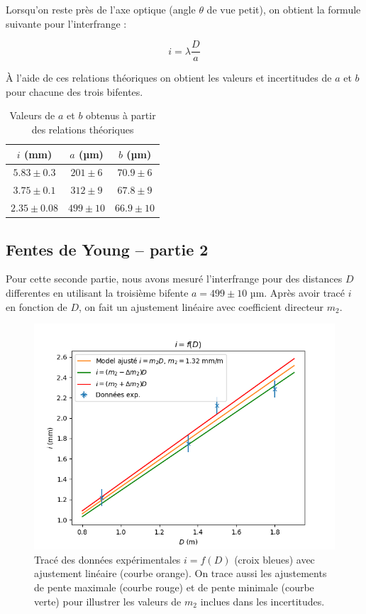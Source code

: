 \documentclass{article}
\begin{document}
Lorsqu'on reste près de l'axe optique (angle $\theta$ de vue petit), on obtient la formule suivante pour l'interfrange :

\begin{equation}
    i = \lambda \frac{D}{a}
    \label{eq:interfrange}
\end{equation}


À l'aide de ces relations théoriques on obtient les valeurs et incertitudes de $a$ et $b$ pour chacune des trois 
bifentes.

\begin{table}[H]
\begin{center}
    \begin{tabular}{|c|c|c|}
    \hline
    $i$ (mm) & $a$ (µm) & $b$ (µm) \\
    \hline
    $5.83 \pm 0.3$ & $201 \pm 6$ & $70.9 \pm 6$ \\
    $3.75 \pm 0.1$ & $312 \pm 9$ & $67.8 \pm 9$ \\
    $2.35 \pm 0.08$ & $499 \pm 10$ & $66.9 \pm 10$ \\
    \hline
\end{tabular}
\end{center}
\caption{Valeurs de $a$ et $b$ obtenus à partir des relations théoriques}
\end{table}

\subsection{Fentes de Young – partie 2}
Pour cette seconde partie, nous avons mesuré l'interfrange pour des distances $D$ differentes en utilisant la troisième bifente $a = 499\pm10 \textrm{ µm}$.
Après avoir tracé $i$ en fonction de $D$, on fait un ajustement linéaire avec coefficient directeur $m_2$.

\begin{figure}[H]
    \centering
    \includegraphics[width=0.6\linewidth]{figs/young_2_i=f(D).png}
    \caption{Tracé des données expérimentales $i=f(D)$ (croix bleues) avec ajustement linéaire (courbe orange). 
    On trace aussi les ajustements de pente maximale (courbe rouge) et de pente minimale (courbe verte) pour illustrer les valeurs de $m_2$ inclues dans les incertitudes.}
    \label{fig:diff_1}
\end{figure}
\end{document}
